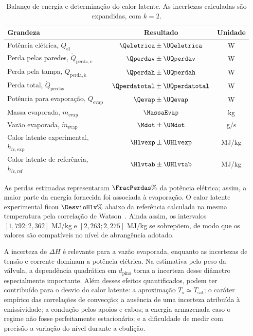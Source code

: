\documentclass[11pt,a4paper]{article}
\newcommand{\Tsat}{T_{\mathrm{sat}}}
\newcommand{\Qdot}{\dot Q}
\newcommand{\mdot}{\dot m}
\begin{document}
\begin{table}[H]
\centering
\caption{Balanço de energia e determinação do calor latente. As incertezas
calculadas são expandidas, com $k=2$.}
\label{tab:energia}
\small
\begin{tabular}{lcc}
\toprule
\textbf{Grandeza} & \textbf{Resultado} & \textbf{Unidade}\\
\midrule
Potência elétrica, $\Qdot_{\mathrm{el}}$ & $\Qeletrica\pm\UQeletrica$ & W\\
Perda pelas paredes, $\Qdot_{\mathrm{perda},v}$ & $\Qperdav\pm\UQperdav$ & W\\
Perda pela tampa, $\Qdot_{\mathrm{perda},h}$ & $\Qperdah\pm\UQperdah$ & W\\
Perda total, $\Qdot_{\mathrm{perdas}}$ & $\Qperdatotal\pm\UQperdatotal$ & W\\
Potência para evaporação, $\Qdot_{\mathrm{evap}}$ & $\Qevap\pm\UQevap$ & W\\
Massa evaporada, $m_{\mathrm{evap}}$ & $\MassaEvap$ & kg\\
Vazão evaporada, $\mdot_{\mathrm{evap}}$ & $\Mdot\pm\UMdot$ & g/s\\
Calor latente experimental, $h_{lv,\mathrm{exp}}$ &
$\Hlvexp\pm\UHlvexp$ & MJ/kg\\
Calor latente de referência, $h_{lv,\mathrm{ref}}$ &
$\Hlvtab\pm\UHlvtab$ & MJ/kg\\
\bottomrule
\end{tabular}
\end{table}

As perdas estimadas representaram $\FracPerdas\%$ da potência elétrica; assim,
a maior parte da energia fornecida foi associada à evaporação. O calor latente
experimental ficou $\DesvioHlv\%$ abaixo da referência calculada na mesma
temperatura pela correlação de Watson~\cite{watson}. Ainda assim, os intervalos
$[1{,}792;2{,}362]$ MJ/kg e $[2{,}263;2{,}275]$ MJ/kg se sobrepõem, de modo que
os valores são compatíveis no nível de abrangência adotado.

A incerteza de $\Delta H$ é relevante para a vazão evaporada, enquanto as
incertezas de tensão e corrente dominam a potência elétrica. Na estimativa pelo
peso da válvula, a dependência quadrática em $d_{\mathrm{pino}}$ torna a
incerteza desse diâmetro especialmente importante. Além desses efeitos
quantificados, podem ter contribuído para o desvio do calor latente: a
aproximação $T_s\simeq\Tsat$; o caráter empírico das correlações de convecção;
a ausência de uma incerteza atribuída à emissividade; a condução pelos apoios e
cabos; a energia armazenada caso o regime não fosse perfeitamente estacionário;
e a dificuldade de medir com precisão a variação do nível durante a ebulição.
\end{document}
